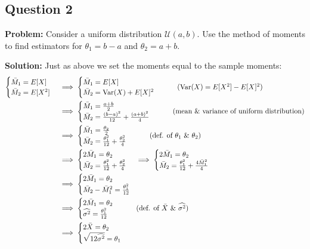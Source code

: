 \documentclass{article}
\DeclareMathOperator{\Var}{Var}
\begin{document}
\subsection*{Question 2}
\noindent\textbf{Problem:} Consider a uniform distribution $\mathcal U(a,b)$. Use the method of moments to find estimators for $\theta_1=b-a$ and $\theta_2=a+b$.
\bigskip

\noindent\textbf{Solution:} Just as above we set the moments equal to the sample moments:
\begin{align*}
    \begin{cases}
        \bar M_1=E[X]\\
        \bar M_2=E[X^2]
    \end{cases}
    &\implies
    \begin{cases}
        \bar M_1=E[X]\\
        \bar M_2=\Var(X)+E[X]^2
    \end{cases}\tag{$\Var(X)=E[X^2]-E[X]^2$}\\
    &\implies
    \begin{cases}
        \bar M_1=\frac{a+b}{2}\\
        \bar M_2=\frac{(b-a)^2}{12}+\frac{(a+b)^2}{4}
    \end{cases}\tag{mean \& variance of uniform distribution}\\
    &\implies
    \begin{cases}
        \bar M_1=\frac{\theta_2}{2}\\
        \bar M_2=\frac{\theta_1^2}{12}+\frac{\theta_2^2}{4}
    \end{cases}\tag{def. of $\theta_1$ \& $\theta_2$}\\
    &\implies
    \begin{cases}
        2\bar M_1=\theta_2\\
        \bar M_2=\frac{\theta_1^2}{12}+\frac{\theta_2^2}{4}
    \end{cases}
    \implies
    \begin{cases}
        2\bar M_1=\theta_2\\
        \bar M_2=\frac{\theta_1^2}{12}+\frac{4\bar M_1^2}{4}
    \end{cases}\\
    &\implies
    \begin{cases}
        2\bar M_1=\theta_2\\
        \bar M_2-\bar M_1^2=\frac{\theta_1^2}{12}
    \end{cases}\\
    &\implies
    \begin{cases}
        2\bar M_1=\theta_2\\
        \widehat{\sigma^2}=\frac{\theta_1^2}{12}
    \end{cases}\tag{def. of $\bar X$ \& $\widehat{\sigma^2}$}\\
    &\implies
    \begin{cases}
        2\bar X=\theta_2\\
        \sqrt{12\widehat{\sigma^2}}=\theta_1
    \end{cases}\\
\end{align*}
\end{document}
